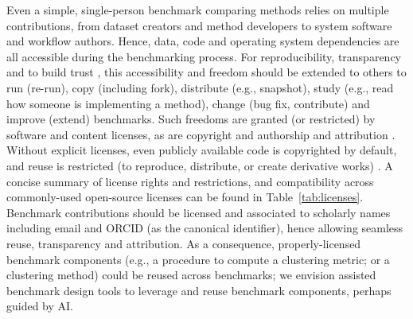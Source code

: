 \documentclass[11pt]{article}
\begin{document}
Even a simple, single-person benchmark comparing methods relies on multiple contributions, from dataset creators and method developers to system software and workflow authors. Hence, data, code and operating system dependencies are all accessible during the benchmarking process. For reproducibility, transparency and to build trust \cite{Laine2007-py}, this accessibility and freedom should be extended to others to run (re-run), copy (including fork), distribute (e.g., snapshot), study (e.g., read how someone is implementing a method), change (bug fix, contribute) and improve (extend) benchmarks. Such freedoms are granted (or restricted) by software and content licenses, as are copyright and authorship and attribution \cite{Kreutzer2014-ua}. Without explicit licenses, even publicly available code is copyrighted by default, and reuse is restricted (to reproduce, distribute, or create derivative works) \cite{Kreutzer2014-ua}. A concise summary of license rights and restrictions, and compatibility across commonly-used open-source licenses can be found in Table~\ref{tab:licenses}. Benchmark contributions should be licensed and associated to scholarly names including email and ORCID (as the canonical identifier), hence allowing seamless reuse, transparency and attribution. As a consequence, properly-licensed benchmark components (e.g., a procedure to compute a clustering metric; or a clustering method) could be reused across benchmarks; we envision assisted benchmark design tools to leverage and reuse benchmark components, perhaps guided by AI.
\end{document}
